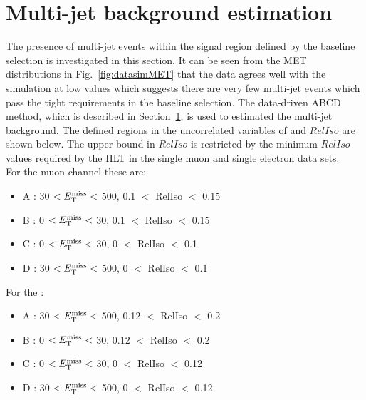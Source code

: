\section{Multi-jet background estimation}
\label{sec:QCDbackground}
The presence of multi-jet events within the signal region defined by the baseline selection is investigated in this section. 
It can be seen from the MET distributions in Fig.~\ref{fig:datasimMET} that the data agrees well with the simulation at low values which suggests there are very few multi-jet events which pass the tight requirements in the baseline selection. 
The data-driven ABCD method, which is described in Section~\ref{sec:QCDbackground}, is used to estimated the multi-jet background. The defined regions in the uncorrelated variables of \MET and $RelIso$ are shown below. The upper bound in $RelIso$ is restricted by the minimum $RelIso$ values required by the HLT in the single muon and single electron data sets.\\

For the muon channel these are:
\begin{itemize}
\setlength\itemsep{0em}
\item A : 30 $<E_{\mathrm{T}}^{\text{miss}}<$ 500, 0.1 $<$ RelIso $<$ 0.15
\item B : 0 $<E_{\mathrm{T}}^{\text{miss}}<$ 30, 0.1 $<$ RelIso $<$ 0.15
\item C : 0 $<E_{\mathrm{T}}^{\text{miss}}<$ 30, 0 $<$ RelIso $<$ 0.1
\item D : 30 $<E_{\mathrm{T}}^{\text{miss}}<$ 500, 0 $<$ RelIso $<$ 0.1
\end{itemize}
For the \eplusjets:
\begin{itemize}
\itemsep0em
\item A : 30 $<E_{\mathrm{T}}^{\text{miss}}<$ 500, 0.12 $<$ RelIso $<$ 0.2
\item B : 0 $<E_{\mathrm{T}}^{\text{miss}}<$ 30, 0.12 $<$ RelIso $<$ 0.2
\item C : 0 $<E_{\mathrm{T}}^{\text{miss}}<$ 30, 0 $<$ RelIso $<$ 0.12
\item D : 30 $<E_{\mathrm{T}}^{\text{miss}}<$ 500, 0 $<$ RelIso $<$ 0.12
\end{itemize}

